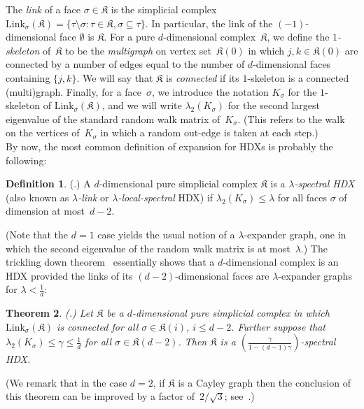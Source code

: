 \documentclass[10pt,a4paper]{article}
\newtheorem{theorem}{Theorem}[section]
\theoremstyle{definition}
\newtheorem{definition}[theorem]{Definition}
\newcommand{\Link}{\mathrm{Link}}
\newcommand{\complex}{\mathfrak{K}}
\begin{document}
The \emph{link} of a face $\sigma \in \complex$ is the simplicial complex $\Link_\sigma(\complex) = \{\tau \setminus \sigma: \tau \in \complex, \sigma \subseteq \tau\}$. In particular, the link of the $(-1)$-dimensional face $\emptyset$ is $\complex$.
For a pure $d$-dimensional complex~$\complex$, we define the \emph{$1$-skeleton} of~$\complex$ to be the \emph{multigraph} on vertex set~$\complex(0)$ in which $j,k \in \complex(0)$ are connected by a number of edges equal to the number of $d$-dimensional faces containing $\{j,k\}$.  We will say that $\complex$ is \emph{connected} if its $1$-skeleton is a connected (multi)graph.  Finally, for a face~$\sigma$, we introduce the notation $K_\sigma$ for the $1$-skeleton of $\Link_\sigma(\complex)$, and we will write $\lambda_2(K_\sigma)$ for the second largest eigenvalue of the standard random walk matrix of~$K_\sigma$. (This refers to the walk on the vertices of~$K_\sigma$ in which a random out-edge is taken at each step.)\\


By now, the most common definition of expansion for HDXs is probably the following:
\begin{definition}
    (\cite{Opp18,KO18}.) A $d$-dimensional pure simplicial complex $\complex$ is a \emph{$\lambda$-spectral HDX} (also known as \emph{$\lambda$-link} or \emph{$\lambda$-local-spectral} HDX) if $\lambda_2(K_\sigma) \le \lambda$ for all faces $\sigma$ of dimension at most~$d-2$.
\end{definition}
\noindent (Note that the $d = 1$ case yields the usual notion of a $\lambda$-expander graph, one in which the second eigenvalue of the random walk matrix is at most~$\lambda$.)  The trickling down theorem~\cite{Opp18} essentially shows that a $d$-dimensional complex is an HDX provided the links of its $(d-2)$-dimensional faces are $\lambda$-expander graphs for $\lambda < \frac{1}{d}$:
\begin{theorem}\label{thm:trickle}
    \textnormal{(\cite{Opp18}.)}
     Let $\complex$ be a $d$-dimensional pure simplicial complex in which $\Link_\sigma(\complex)$ is connected for all $\sigma \in \complex(i)$, $i \leq d-2$.  Further suppose that $\lambda_2(K_\sigma) \leq \gamma \leq \frac{1}{d}$ for all $\sigma \in \complex(d-2)$.
    Then $\complex$ is a $\left (\frac{\gamma}{1-(d-1)\gamma} \right)$-spectral HDX.
\end{theorem}
\noindent (We remark that in the case $d = 2$, if $\complex$ is a Cayley graph then the conclusion of this theorem can be improved by a factor of~$2/\sqrt{3}$; see~\cite{Zuk03}.)\\
\end{document}
